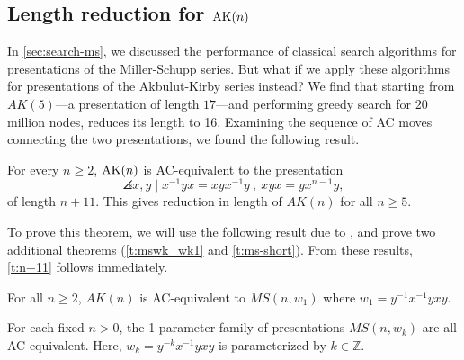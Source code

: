 

\subsection{Length reduction for $\text{AK}(n)$}
\label{sec:len-reduction}

In \cref{sec:search-ms}, we discussed the performance of classical search algorithms for presentations of the Miller-Schupp series. But what if we apply these algorithms for presentations of the Akbulut-Kirby series instead? We find that starting from $AK(5)$---a presentation of length $17$---and performing greedy search for $20$ million nodes, reduces its length to 16. Examining the sequence of AC moves connecting the two presentations, we found the following result.

\begin{theorem}\label{t:n+11}
	For every $n\geq 2$, $\text{AK}(n)$ is AC-equivalent to the presentation
	\[
	\angles{ x,y \mid x^{-1} y x = x y x^{-1} y \ ,\  xyx=yx^{n-1}y },
	\]
	of length $n+11$. This gives reduction in length of $AK(n)$ for all $n \geq 5$.
\end{theorem}

To prove this theorem, we will  use the following result due to \cite{MMS}, and prove two additional theorems (\cref{t:mswk_wk1} and \cref{t:ms-short}). From these results, \cref{t:n+11} follows immediately. 

\begin{proposition}
    \label{t:MS-AK-MS}
    For all $n \geq 2$, $AK(n)$ is AC-equivalent to $MS(n, w_1)$ where $w_1 = y^{-1} x^{-1} y x y$.
\end{proposition}

\begin{theorem}\label{t:mswk_wk1}
    For each fixed $n > 0$, the 1-parameter family of presentations $MS(n, w_k)$ are all AC-equivalent. Here, $w_k = y^{-k} x^{-1} y x y$ is parameterized by $k \in \mathbb{Z}$. 
\end{theorem}


